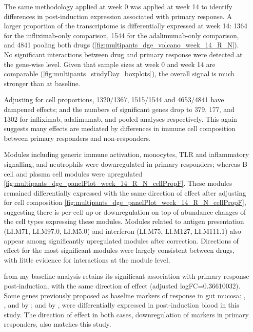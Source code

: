 \begin{outline}
The same methodology applied at week 0 was applied at week 14 to identify differences in post-induction expression associated with primary response.
A larger proportion of the transcriptome is differentially expressed at week 14: 
1364 for the infliximab-only comparison, 
1544 for the adalimumab-only comparison, 
and 4841 pooling both drugs (\autoref{fig:multipants_dge_volcano_week_14_R_N}).
No significant interactions between drug and primary response were detected at the gene-wise level.
Given that sample sizes at week 0 and week 14 are comparable (\autoref{fig:multipants_studyDay_boxplots}), the overall signal is much stronger than at baseline.

Adjusting for cell proportions, 1320/1367, 1515/1544 and 4653/4841 have dampened effects;
and the numbers of significant genes drop to 379, 177, and 1302 for infliximab, adalimumab, and pooled analyses respectively.
This again suggests many effects are mediated by differences in immune cell composition between primary responders and non-responders.

Modules including generic immune activation, monocytes, TLR and inflammatory signalling, and neutrophils were downregulated in primary responders; 
whereas B cell and plasma cell modules were upregulated \autoref{fig:multipants_dge_panelPlot_week_14_R_N_cellPropF}.
These modules remained differentially expressed with the same direction of effect after adjusting for cell composition \autoref{fig:multipants_dge_panelPlot_week_14_R_N_cellPropF}, 
suggesting there is per-cell up or downregulation on top of abundance changes of the cell types expressing these modules.
Modules related to antigen presentation (LI.M71, LI.M97.0, LI.M5.0) and interferon (LI.M75, LI.M127, LI.M111.1) also appear among significantly upregulated modules after correction.
Directions of effect for the most significant modules were largely consistent between drugs, with little evidence for interactions at the module level.

 from my baseline analysis retains its significant association with primary response post-induction, with the same direction of effect (adjusted logFC=\num{0.36610032}).
Some genes previously proposed as baseline markers of response in gut mucosa: , ,  and  by \autocite{arijs2010PredictiveValueEpithelial}; and  by \autocite{west2017OncostatinDrivesIntestinal},
were differentially expressed in post-induction blood in this study.
The direction of effect in both cases, downregulation of markers in primary responders, also matches this study.


\end{outline}
